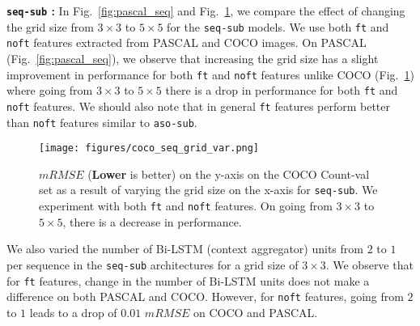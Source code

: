 \documentclass[10pt,twocolumn,letterpaper]{article}
\newcommand{\sub}{\texttt{aso-sub}\xspace}
\newcommand{\seq}{\texttt{seq-sub}\xspace}
\newcommand{\reffig}[1]{Fig.~\ref{#1}}
\begin{document}
\textbf{\seq{} : }
In \reffig{fig:pascal_seq} and \reffig{fig:coco_seq}, we compare the effect of changing the grid size from $3\times3$ to $5\times5$ for the \seq models. We use both \texttt{ft} and \texttt{noft} features extracted from PASCAL and COCO images. On PASCAL (\reffig{fig:pascal_seq}), we observe that increasing the grid size has a slight improvement in performance for both \texttt{ft} and \texttt{noft} features unlike COCO (\reffig{fig:coco_seq}) where going from $3\times3$ to $5\times5$ there is a drop in performance for both \texttt{ft} and \texttt{noft} features. We should also note that in general \texttt{ft} features perform better than \texttt{noft} features similar to \sub.
\begin{figure}
\texttt{[image: figures/coco\_seq\_grid\_var.png]}
\caption{$mRMSE$ (\textbf{Lower} is better) on the y-axis on the COCO Count-val set as a result of varying the grid size on the x-axis for \seq. We experiment with both \texttt{ft} and \texttt{noft} features. On going from $3\times3$ to $5\times5$, there is a decrease in performance.}
\label{fig:coco_seq}
\end{figure}

We also varied the number of Bi-LSTM (context aggregator) units from $2$ to $1$ per sequence in the \seq architectures for a grid size of $3\times3$. We observe that for \texttt{ft} features, change in the number of Bi-LSTM units does not make a difference on both PASCAL and COCO. However, for \texttt{noft} features, going from $2$ to $1$ leads to a drop of $0.01$ $mRMSE$ on COCO and PASCAL.




 
\end{document}
